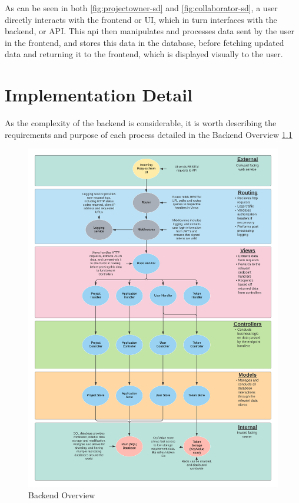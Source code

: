 \documentclass[a4paper,11pt]{report}
\begin{document}
As can be seen in both \ref{fig:projectowner-sd} and \ref{fig:collaborator-sd},
a user directly interacts with the frontend or UI, which in turn interfaces with
the backend, or API. This api then manipulates and processes data sent by the
user in the frontend, and stores this data in the database, before fetching
updated data and returning it to the frontend, which is displayed visually to
the user.

\chapter{Implementation Detail}
As the complexity of the backend is considerable, it is worth describing the
requirements and purpose of each process detailed in the Backend Overview
\ref{fig:backend-overview}

\begin{figure}[b]
    \centering
    \includegraphics[width=\textwidth,keepaspectratio]{backend-overview.png}
    \caption{Backend Overview}
    \label{fig:backend-overview}
\end{figure}
\end{document}

